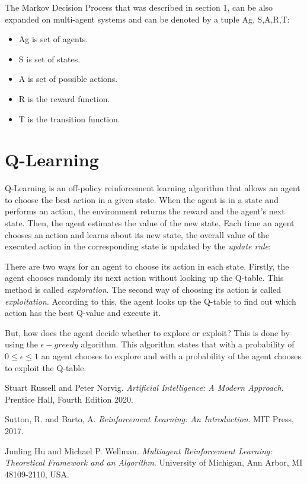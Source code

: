 \documentclass[10pt,a4paper,twocolumn]{article}
\begin{document}
	The Markov Decision Process that was described in section 1, can be also expanded on multi-agent systems and can be denoted by a tuple {Ag, S,A,R,T}:
	
	\begin{itemize}
		\item Ag is set of agents. 
		\item S is set of states.
		\item A is set of possible actions.
		\item R is the reward function.
		\item T is the transition function.
	\end{itemize}


	\section{Q-Learning}
	Q-Learning is an off-policy reinforcement learning algorithm that allows an agent to choose the best action in a given state. When the agent is in a state and performs an action, the environment returns the reward and the agent’s next state. Then, the agent estimates the value of the new state. Each time an agent chooses an action and learns about its new state, the overall value of the executed action in the corresponding state is updated by the \textit{update rule}:
	
	
	
	There are two ways for an agent to choose its action in each state. Firstly, the agent chooses randomly its next action without looking up the Q-table. This method is called \textit{exploration}. The second way of choosing its action is called \textit{exploitation}. According to this, the agent looks up the Q-table to find out which action has the best Q-value and execute it.
	
	But, how does the agent decide whether to explore or exploit? This is done by using the $\epsilon - greedy$ algorithm. This algorithm states that with a probability of $0 \le \epsilon \le 1 $  an agent chooses to explore and with a probability of  the agent chooses to exploit the Q-table.

	\begin{thebibliography}{9}
		Stuart Russell and Peter Norvig. 
		\textit{Artificial Intelligence: A Modern Approach}. 
		Prentice Hall, Fourth Edition 2020.
		
		Sutton, R. and Barto, A. 
		\textit{Reinforcement Learning: An Introduction}. 
		MIT Press, 2017.
		
		Junling Hu and Michael P. Wellman.
		\textit{Multiagent Reinforcement Learning: Theoretical Framework and an Algorithm}. 
		University of Michigan, Ann Arbor, MI 48109-2110, USA.

	\end{thebibliography}
	
\end{document}
